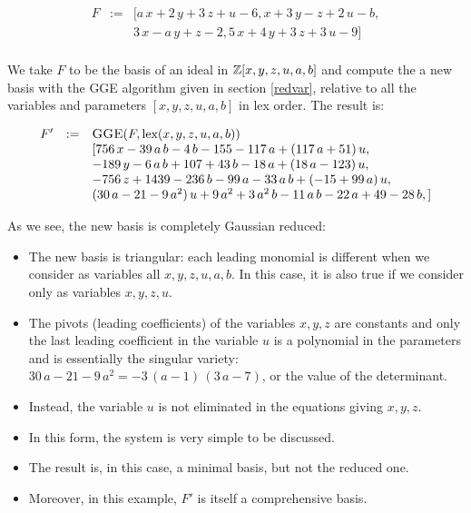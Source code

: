 \[
\begin{array}{lcl}
F &:=& [a\,x+2\,y+3\,z+u-6, x+3\,y-z+2\,u-b, \\
 & & 3\,x-a\,y+z-2, 5\,x+4\,y+3\,z+3\,u-9] \\
\end{array}
\]

We take $F$ to be the basis of an ideal in ${\mathbb{Z}}[x,y,z,u,a,b]$
and compute the a new basis with the {\sc GGE} algorithm given in
section \ref{redvar}, relative to all the variables and parameters
$[x,y,z,u,a,b]$ in lex order. The result is:

\[
\begin{array}{lcl}
F' &:=& \hbox{\sc GGE}(F,\hbox{lex}(x,y,z,u,a,b)) \\
&&[756\,x-39\,a\,b-4\,b-155-117\,a+(117\,a+51)\,u, \\ &&
-189\,y-6\,a\,b+107+43\,b-18\,a+(18\,a-123)\,u, \\ &&
-756\,z+1439-236\,b-99\,a-33\,a\,b+(-15+99\,a)\,u, \\ &&
(30\,a-21-9\,a^2)\,u+9\,a^2+3\,a^2\,b-11\,a\,b-22\,a+49-28\,b,]\\
\end{array}
\]

As we see, the new basis is completely Gaussian reduced:
\begin{itemize}
\item The new basis is triangular: each leading monomial is different when we consider as
variables all $x,y,z,u,a,b$. In this case, it is also true if we
consider only as variables $x,y,z,u$.
\item The pivots (leading coefficients) of the variables $x,y,z$ are
constants and only the last leading coefficient in the variable $u$ is a polynomial in
the parameters and is essentially the singular variety:
$30\,a-21-9\,a^2=-3\,(a-1)\,(3\,a-7)$, or the value of the
determinant.
\item Instead, the variable $u$ is not eliminated in the equations
giving $x,y,z$.
\item In this form, the system is very simple to be discussed.
\item The result is, in this case, a minimal \Gr basis, but not the reduced
one.
\item Moreover, in this example, $F'$ is itself a comprehensive
\Gr basis.
\end{itemize}


